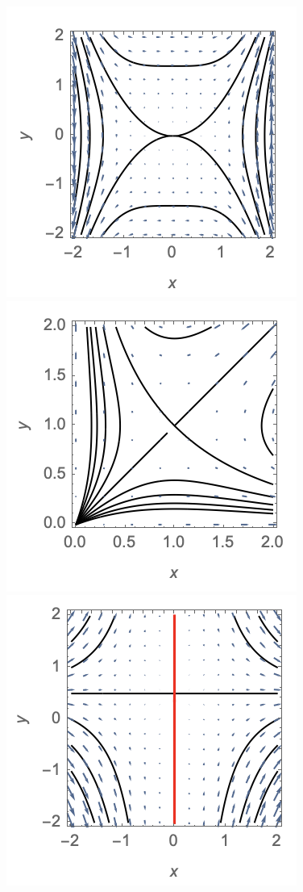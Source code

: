 \documentclass[12pt,letterpaper,noanswers]{exam}
\begin{document}
\includegraphics[scale=0.9]{img/C12conservative-p3.png}
\includegraphics[scale=0.9]{img/C12conservative-p2.png}
\includegraphics[scale=0.9]{img/C12conservative-p1.png}
\end{document}
